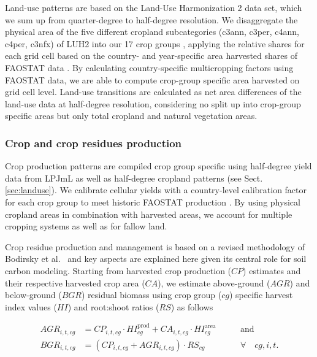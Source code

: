 \documentclass[gc, manuscript]{copernicus}
\begin{document}
Land-use patterns are based on the Land-Use Harmonization 2 \citep{hurtt_harmonization_2020} data set, which we sum up from quarter-degree to half-degree resolution. We disaggregate the physical area of the five different cropland subcategories (c3ann, c3per, c4ann, c4per, c3nfx) of LUH2 into our 17 crop groups \citep[see FAO2LUH2MAG\_croptypes.csv in][]{bodirsky_mrcommons_2020}, applying the relative shares for each grid cell based on the country- and year-specific area harvested shares of FAOSTAT data \citep{faostat_faostat_2016}. By calculating country-specific multicropping factors using FAOSTAT data, we are able to compute crop-group specific area harvested on grid cell level.
Land-use transitions are calculated as net area differences of the land-use data at half-degree resolution, considering no split up into crop-group specific areas but only total cropland and natural vegetation areas.

\hypertarget{sec:residues}{%
\subsubsection{Crop and crop residues production}\label{sec:residues}}

Crop production patterns are compiled crop group specific using half-degree yield data from LPJmL \citep{schaphoff_lpjml4_2018} as well as half-degree cropland patterns (see Sect. \ref{sec:landuse}). We calibrate cellular yields with a country-level calibration factor for each crop group to meet historic FAOSTAT production \citep{faostat_faostat_2016}. By using physical cropland areas in combination with harvested areas, we account for multiple cropping systems as well as for fallow land.

Crop residue production and management is based on a revised methodology of Bodirsky et al.~\citeyearpar{bodirsky_n2o_2012} and key aspects are explained here given its central role for soil carbon modeling. Starting from harvested crop production (\(CP\)) estimates and their respective harvested crop area (\(CA\)), we estimate above-ground (\(AGR\)) and below-ground (\(BGR\)) residual biomass using crop group (\(cg\)) specific harvest index values (\(HI\)) and root:shoot ratios (\(RS\)) as follows

\begin{equation}
\begin{aligned}
AGR_{i,t,cg} & = CP_{i,t,cg} \cdot HI^{\mathrm{prod}}_{cg} + CA_{i,t,cg} \cdot HI^{\mathrm{area}}_{cg}
\qquad & \textrm{and} \\
BGR_{i,t,cg} & = (CP_{i,t,cg} + AGR_{i,t,cg}) \cdot RS_{cg} \qquad                                            & \forall\quad cg, i, t.
\label{eq:resbiomass}
\end{aligned}
\end{equation}
\end{document}
